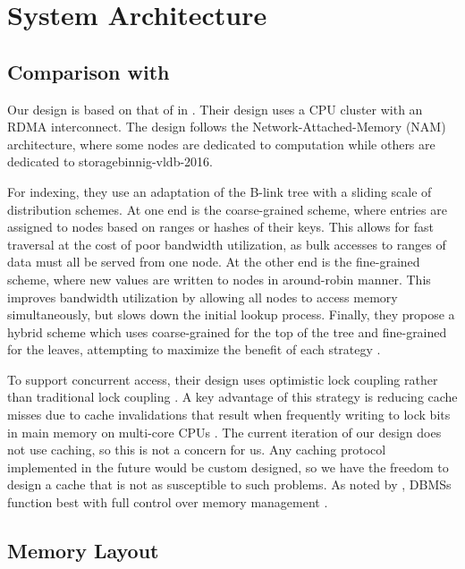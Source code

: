 \section{System Architecture}

\subsection{Comparison with \citeauthor{base}}

Our design is based on that of \citeauthor{base} in . Their design uses a CPU cluster with an RDMA interconnect. The design follows the Network-Attached-Memory (NAM) architecture, where some nodes are dedicated to computation while others are dedicated to storage\cite{base}{binnig-vldb-2016}.

For indexing, they use an adaptation of the B-link tree with a sliding scale of distribution schemes. At one end is the coarse-grained scheme, where entries are assigned to nodes based on ranges or hashes of their keys. This allows for fast traversal at the cost of poor bandwidth utilization, as bulk accesses to ranges of data must all be served from one node. At the other end is the fine-grained scheme, where new values are written to nodes in around-robin manner. This improves bandwidth utilization by allowing all nodes to access memory simultaneously, but slows down the initial lookup process. Finally, they propose a hybrid scheme which uses coarse-grained for the top of the tree and fine-grained for the leaves, attempting to maximize the benefit of each strategy \cite{base}.

To support concurrent access, their design uses optimistic lock coupling rather than traditional lock coupling \cite{base}. A key advantage of this strategy is reducing cache misses due to cache invalidations that result when frequently writing to lock bits in main memory on multi-core CPUs \cite{leis-daomn-2016}. The current iteration of our design does not use caching, so this is not a concern for us. Any caching protocol implemented in the future would be custom designed, so we have the freedom to design a cache that is not as susceptible to
such problems. As noted by \citeauthor{binnig-vldb-2016}, DBMSs function best with full control over memory management \cite{binnig-vldb-2016}.


\subsection{Memory Layout}


